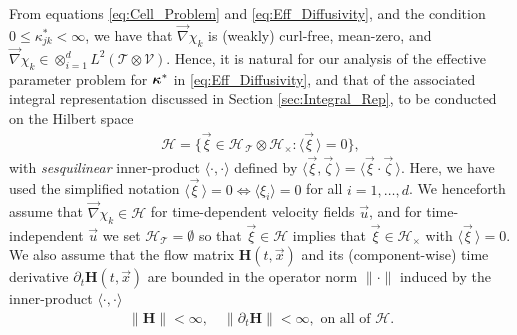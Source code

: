 \documentclass[11pt]{amsart}
\newcommand{\Hb}{\mathbf{H}}
\newcommand{\Tc}{\mathcal{T}}
\newcommand{\Vc}{\mathcal{V}}
\newcommand{\Hs}{\mathscr{H}}
\newcommand\bkappa{\mbox{\boldmath${\kappa}$}}
\begin{document}
From equations \eqref{eq:Cell_Problem} and \eqref{eq:Eff_Diffusivity},
and the condition $0\leq\kappa^*_{jk}<\infty$, we have that $\vec{\nabla}\chi_k$ is (weakly)
curl-free, mean-zero, and
$\vec{\nabla}\chi_k\in\otimes_{i=1}^dL^2(\Tc\otimes\Vc)$. Hence,
it is natural for our analysis of the effective parameter problem for
$\bkappa^*$ in \eqref{eq:Eff_Diffusivity}, and that of the associated
integral representation discussed in Section \ref{sec:Integral_Rep},
to be conducted on the Hilbert space
%
\begin{align}\label{eq:Hilbert_Space}
  \Hs=\{\vec{\xi}\in\Hs_{\,\Tc}\otimes\Hs_\times: \langle\vec{\xi}\,\rangle=0\},
\end{align}
%
with \emph{sesquilinear} inner-product $\langle\cdot,\cdot\rangle$ defined by
$\langle\vec{\xi},\vec{\zeta}\,\rangle=\langle\vec{\xi}\cdot\vec{\zeta}\,\rangle$. 
Here, we have used the simplified notation $\langle\vec{\xi}\,\rangle=0\iff\langle\xi_i\rangle=0$ for
all $i=1,\ldots,d$. We henceforth assume that $\vec{\nabla}\chi_k\in\mathscr{H}$ for
time-dependent velocity fields $\vec{u}$, and for time-independent
$\vec{u}$ we set $\mathscr{H}_{\Tc}=\emptyset$ so that $\vec{\xi}\in\mathscr{H}$
implies that $\vec{\xi}\in\mathscr{H}_\times$ with $\langle\vec{\xi}\,\rangle=0$. We also
assume that the flow matrix $\Hb(t,\vec{x})$ and its (component-wise)
time derivative $\partial_t\Hb(t,\vec{x})$ are bounded in the operator norm
$\|\cdot\|$ induced by the inner-product $\langle\cdot,\cdot\rangle$
\cite{Reed-1980,Stone:64,Stakgold:BVP:2000}   
%
\begin{align}\label{eq:Bounded_H}
  \|\Hb\|<\infty, \quad \|\partial_t\Hb\|<\infty, \text{ on all of } \Hs.
\end{align}
%
\end{document}
